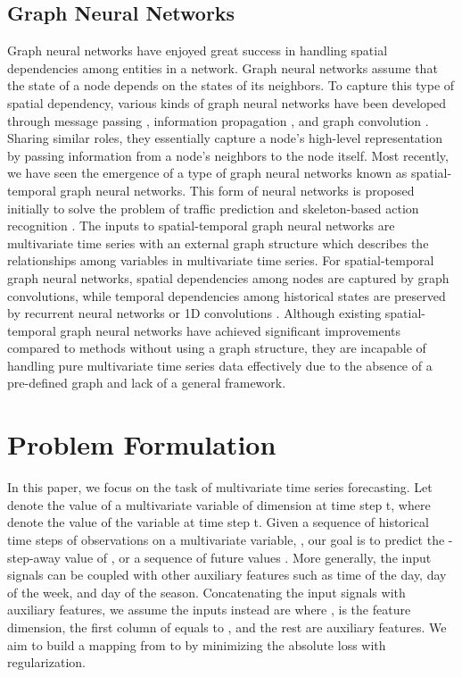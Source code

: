 \documentclass[sigconf]{acmart}
\begin{document}
\subsection{Graph Neural Networks}
Graph neural networks have enjoyed great success in handling spatial dependencies among entities in a network. Graph neural networks assume that the state of a node depends on the states of its neighbors. To capture this type of spatial dependency,  various kinds of graph neural networks have been developed through message passing \cite{gilmer2017neural},
information propagation \cite{klicpera2019predict},
and graph convolution \cite{kipf2017semi}. 
Sharing similar roles, they essentially capture a node's high-level representation by passing information from a node's neighbors to the node itself. Most recently, we have seen the emergence of a type of graph neural networks known as spatial-temporal graph neural networks. This form of neural networks is proposed initially to solve the problem of traffic prediction \cite{li2018diffusion,yu2018spatio,wu2019graph,zheng2020gman,chen2020multi} and skeleton-based action recognition \cite{yan2018spatial, shi2019two}.  The inputs to spatial-temporal graph neural networks are multivariate time series with an external graph structure which describes the relationships among variables in multivariate time series. For spatial-temporal graph neural networks, spatial dependencies among nodes are captured by graph convolutions, while temporal dependencies among historical states are preserved by recurrent neural networks \cite{seo2018structured,li2018diffusion} or 1D convolutions \cite{yu2018spatio,yan2018spatial}.
Although existing spatial-temporal graph neural networks have achieved significant improvements compared to methods without using a graph structure, they are incapable of handling pure multivariate time series data effectively due to the absence of a pre-defined graph and lack of a general framework. 


\section{Problem Formulation}

In this paper, we focus on the task of multivariate time series forecasting.  Let  denote the value of a multivariate variable of dimension  at time step t, where  denote the value of the  variable at time step t.  Given a sequence of historical  time steps of observations on a multivariate variable,  , our goal is to predict the -step-away value of , or a sequence of future values  . 
More generally, the input signals can be coupled with other auxiliary features such as time of the day, day of the week, and day of the season.
Concatenating the input signals with auxiliary features, we assume the inputs instead are   where ,  is the feature dimension, the first column of  equals to , and the rest are auxiliary features. We aim to build a mapping  from  to   by minimizing the absolute loss with  regularization. 
\end{document}
